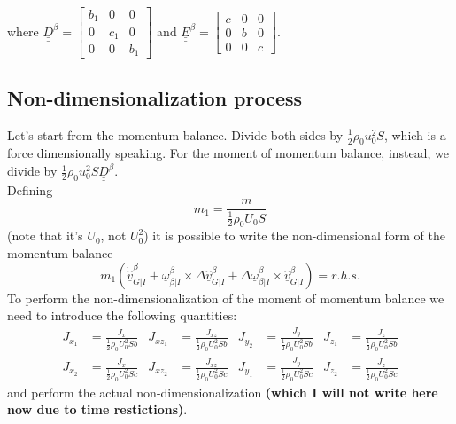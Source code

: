 where $\underline{\underline{D}}^\beta = \begin{bmatrix}
    b_1 & 0 & 0 \\ 0 & c_1 & 0 \\ 0& 0& b_1
\end{bmatrix}$ and $\underline{\underline{E}}^\beta = \begin{bmatrix}
    c & 0 & 0 \\ 0 & b & 0 \\ 0& 0& c
\end{bmatrix}$.
\subsection{Non-dimensionalization process}
Let's start from the momentum balance. Divide both sides by $\frac{1}{2}\rho_0u_0^2S$, which is a force dimensionally speaking.
For the moment of momentum balance, instead, we divide by $\frac{1}{2}\rho_0u_0^2 S\underline{\underline{D}}^\beta$.
\\
Defining 
\begin{equation}
    m_1  = \frac{m}{\frac{1}{2}\rho_0U_0S}
\end{equation}
(note that it's $U_0$, not $U_0^2$) it is possible to write the non-dimensional form of the momentum balance
\begin{equation}
    m_1(\underline{\dot{\hat{v}}}_{G|I}^\beta + \underline{\omega}_{\beta|I}^\beta \times \Delta \underline{\hat v}_{G|I}^\beta + \Delta \underline{\omega}_{\beta|I}^\beta \times \underline{\hat v}_{G|I}^\beta)=r.h.s.
\end{equation}
To perform the non-dimensionalization of the moment of momentum balance we need to introduce the following quantities:
\begin{align}
    J_{x_1} &= \frac{J_x}{\frac{1}{2}\rho_0U_0^2Sb} &
    J_{xz_1} &= \frac{J_{xz}}{\frac{1}{2}\rho_0U_0^2Sb} &
    J_{y_2} &= \frac{J_y}{\frac{1}{2}\rho_0U_0^2Sb} &
    J_{z_1} &= \frac{J_z}{\frac{1}{2}\rho_0U_0^2Sb} \\
    J_{x_2} &= \frac{J_x}{\frac{1}{2}\rho_0U_0^2Sc} &
    J_{xz_2} &= \frac{J_{xz}}{\frac{1}{2}\rho_0U_0^2Sc} &
    J_{y_1} &= \frac{J_y}{\frac{1}{2}\rho_0U_0^2Sc} &
    J_{z_2} &= \frac{J_z}{\frac{1}{2}\rho_0U_0^2Sc} 
\end{align}
and perform the actual non-dimensionalization \textbf{(which I will not write here now due to time restictions)}.


